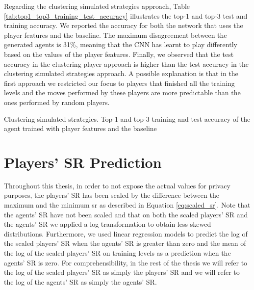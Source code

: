 Regarding the clustering simulated strategies approach, Table \ref{tab:top1_top3_training_test_accuracy} illustrates the top-1 and top-3 test and training accuracy. We reported the accuracy for both the network that uses the player features and the baseline. 
The maximum disagreement between the generated agents is 31\%, meaning that the \acs{CNN} has learnt to play differently based on the values of the player features.
Finally, we observed that the test accuracy in the clustering player approach is higher than the test accuracy in the clustering simulated strategies approach. A possible explanation is that in the first approach we restricted our focus to players that finished all the training levels and the moves performed by these players are more predictable than the ones performed by random players.  
\begin{table}[h]
    \centering
    \small
    \caption{Clustering simulated strategies. Top-1 and top-3 training and test accuracy of the agent trained with player features and the baseline} 
    
    \label{tab:top1_top3_training_test_accuracy}
\end{table} 



\section{Players' SR Prediction}
Throughout this thesis, in order to not expose the actual values for privacy purposes, the players’ SR has been scaled by the difference between the maximum and the minimum \acs{sr} as described in Equation \ref{eq:scaled_sr}.
Note that the agents' SR have not been scaled and that on both the scaled players' SR and the agents' SR we applied a log transformation to obtain less skewed distributions.
Furthermore, we used linear regression models to predict the log of the scaled players' SR when the agents' SR is greater than zero and the mean of the log of the scaled players' SR on training levels as a prediction when the agents' SR is zero. For comprehensibility, in the rest of the thesis we will refer to the log of the scaled players' SR as simply the players' SR and we will refer to the log of the agents' SR as simply the agents' SR. 


